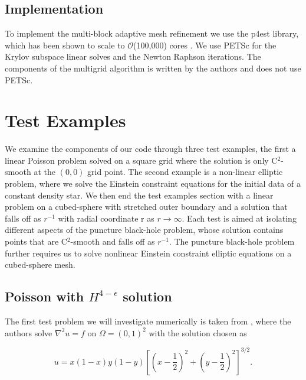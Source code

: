 \subsection{Implementation}

To implement the multi-block adaptive mesh refinement we use the p4est library, which has been shown to scale to $\mathcal{O}$(100,000) cores \cite{burstedde2011p4est}. We use PETSc \cite{petsc_home_page} for the Krylov subspace linear solves and the Newton Raphson iterations. The components of the multigrid algorithm is written by the authors and does not use PETSc.


\section{Test Examples}

\label{sec:testexamples}
We examine the components of our code through three test examples, the first a linear Poisson problem solved on a square grid where the solution is only C$^{2}$-smooth at the $(0,0)$ grid point. The second example is a non-linear elliptic problem, where we solve the Einstein constraint equations for the initial data of a constant density star. We then end the test examples section with a linear problem on a cubed-sphere with stretched outer boundary and a solution that falls off as $r^{-1}$ with radial coordinate r as $r \rightarrow \infty$. Each test is aimed at isolating different aspects of the puncture black-hole problem, whose solution contains points that are C$^{2}$-smooth and falls off as $r^{-1}$. The puncture black-hole problem further requires us to solve nonlinear Einstein constraint elliptic equations on a cubed-sphere mesh.

\subsection{Poisson with $H^{4-\epsilon}$ solution}

The first test problem we will investigate numerically is taken from \cite{stamm2010hp}, where the authors solve $\nabla^{2}u = f$ on $\Omega = (0,1)^{2}$ with the solution chosen as

\begin{equation}
    \label{eq:testexample1solution}
 u = x\left(1-x\right)y\left(1-y\right)\left[\left(x-\frac{1}{2}\right)^2 + \left(y-\frac{1}{2}\right)^2\right]^{3/2}.
\end{equation}


